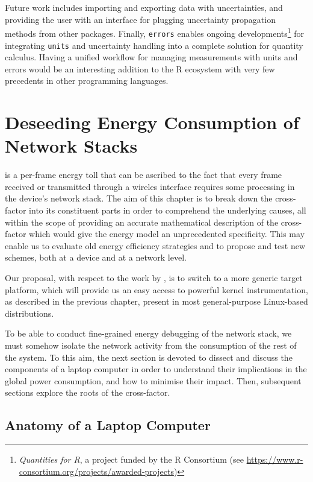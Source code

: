 \documentclass[twoside,nohyper]{tufte-book}
\begin{document}
Future work includes importing and exporting data with uncertainties, and providing the user with an interface for plugging uncertainty propagation methods from other packages. Finally, \texttt{errors} enables ongoing developments\footnote{\emph{Quantities for R}, a project funded by the R Consortium (see \url{https://www.r-consortium.org/projects/awarded-projects})} for integrating \texttt{units} and uncertainty handling into a complete solution for quantity calculus. Having a unified workflow for managing measurements with units and errors would be an interesting addition to the R ecosystem with very few precedents in other programming languages.

\hypertarget{ch:04}{%
\chapter{Deseeding Energy Consumption of Network Stacks}\label{ch:04}}

 is a per-frame energy toll that can be ascribed to the fact that every frame received or transmitted through a wireles interface requires some processing in the device's network stack. The aim of this chapter is to break down the cross-factor into its constituent parts in order to comprehend the underlying causes, all within the scope of providing an accurate mathematical description of the cross-factor which would give the energy model an unprecedented specificity. This may enable us to evaluate old energy efficiency strategies and to propose and test new schemes, both at a device and at a network level.

Our proposal, with respect to the work by \citet{Serrano2014}, is to switch to a more generic target platform, which will provide us an easy access to powerful kernel instrumentation, as described in the previous chapter, present in most general-purpose Linux-based distributions.

To be able to conduct fine-grained energy debugging of the network stack, we must somehow isolate the network activity from the consumption of the rest of the system. To this aim, the next section is devoted to dissect and discuss the components of a laptop computer in order to understand their implications in the global power consumption, and how to minimise their impact. Then, subsequent sections explore the roots of the cross-factor.

\hypertarget{anatomy-of-a-laptop-computer}{%
\section{Anatomy of a Laptop Computer}\label{anatomy-of-a-laptop-computer}}
\end{document}
